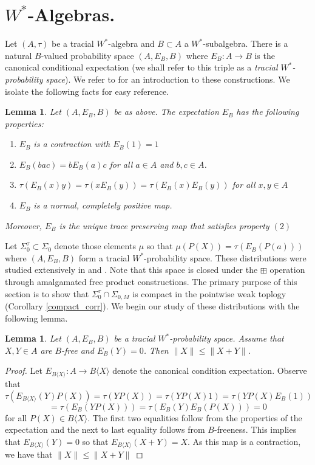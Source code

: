 \documentclass[11pt]{amsart}
\newtheorem{lemma}[theorem]{Lemma}
\begin{document}
\section{$W^{\ast}$-Algebras.}
Let $(A,\tau)$ be a tracial $W^{\ast}$-algebra and $B\subset A$ a $W^{\ast}$-subalgebra.  There is a natural
$B$-valued probability space $(A,E_{B},B)$ where $E_{B}:A \rightarrow B$ is the canonical conditional expectation (we shall refer to this triple as
a \textit{tracial $W^{\ast}$-probability space}).  We
refer to \cite{SS} for an introduction to these constructions.  We isolate the following facts for easy reference.

\begin{lemma}\label{expectations}
Let $(A,E_{B},B)$ be as above.  The expectation $E_{B}$ has the following properties:
\begin{enumerate}
 \item 
$E_{B}$ is a contraction with $E_{B}(1)=1$
\item
$E_{B}(bac) = bE_{B}(a)c$ for all $a\in A$ and $b,c\in A$.
\item
$\tau(E_{B}(x)y) = \tau(xE_{B}(y)) = \tau(E_{B}(x)E_{B}(y))$ for all $x,y \in A$
\item
$E_{B}$ is a normal, completely positive map.
\end{enumerate}
Moreover, $E_{B}$ is the unique trace preserving map that satisfies property $(2)$  
\end{lemma}

Let $\Sigma_{0}^{\tau} \subset \Sigma_{0}$ denote those elements $\mu$ so that $\mu(P(X)) = \tau(E_{B}(P(a)))$ where $(A,E_{B},B)$ form a tracial $W^{\ast}$-probability space.
  These distributions were studied extensively in \cite{vo5} and \cite{vo6}.  Note that this space is
closed under the $\boxplus$ operation through amalgamated free product constructions.  The primary purpose of this
section is to show that $\Sigma_{0}^{\tau} \cap \Sigma_{0,M}$ is compact in the pointwise weak toplogy (Corollary \ref{compact_corr}).  We begin our study of these distributions
with the following lemma.

\begin{lemma}\label{contraction_lemma}
Let $(A,E_{B},B)$ be a tracial $W^{\ast}$-probability space.  Assume that $X,Y \in A$ are $B$-free and 
$E_{B}(Y) = 0$.  Then $\| X \| \leq \|X + Y \|$.
\end{lemma}
\begin{proof}
Let $E_{B\langle X \rangle}: A \rightarrow B\langle X \rangle$ denote the canonical condition expectation.
Observe that 
$$\tau(E_{B\langle X \rangle}(Y)P(X)) = \tau(YP(X)) = \tau(YP(X)1) = \tau(YP(X)E_{B}(1))$$
$$ = \tau(E_{B}(YP(X))) = \tau(E_{B}(Y)E_{B}(P(X)))= 0$$
for all $P(X)\in B\langle X \rangle$.  The first two equalities follow from the properties of the expectation and the next to last equality follows 
from $B$-freeness.
This implies that $E_{B\langle X \rangle}(Y) = 0$ so that $E_{B\langle X \rangle}(X+Y) = X$.  As this map is a contraction,
we have that $\|X \| \leq \|X+Y \|$
\end{proof}
\end{document}
